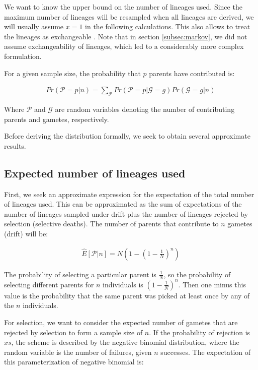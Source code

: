 \documentclass[review]{elsarticle}
\begin{document}
We want to know the upper bound on the number of lineages used. Since the maximum number of lineages
will be resampled when all lineages are derived, we will usually assume $x=1$ in the following
calculations. This also allows to treat the lineages as exchangeable \cite{Wakeley2009}. Note that
in section \ref{subsec:markov}, we did not assume exchangeability of lineages, which led to a
considerably more complex formulation.

For a given sample size, the probability that $p$ parents have contributed is:

\begin{align}
  \label{eq:conditional}
  Pr(\mathcal{P}=p|n) = \sum_{\mathcal{P}}Pr(\mathcal{P}=p|\mathcal{G}=g)Pr(\mathcal{G}=g|n)
\end{align}

Where $\mathcal{P}$ and $\mathcal{G}$ are random variables denoting the number of contributing
parents and gametes, respectively.

Before deriving the distribution formally, we seek to obtain several approximate results.

\subsection{Expected number of lineages used}
\label{subsec:exp-number}

First, we seek an approximate expression for the expectation of the total number of lineages used.
This can be approximated as the sum of expectations of the number of lineages sampled under drift
plus the number of lineages rejected by selection (selective deaths). The number of parents that
contribute to $n$ gametes (drift) will be:

\begin{align}
  \hat{E}[\mathcal{P}|n] = N(1-\left( 1 - \frac{1}{N} \right)^n)
\end{align}

The probability of selecting a particular parent is $\frac{1}{N}$, so the probability of selecting
different parents for $n$ individuals is $(1-\frac{1}{N})^n$. Then one minus this value is the
probability that the same parent was picked at least once by any of the $n$ individuals.

For selection, we want to consider the expected number of gametes that are rejected by selection
to form a sample size of $n$. If the probability of rejection is $xs$, the scheme is described by the
negative binomial distribution, where the random variable is the number of failures, given $n$
successes. The expectation of this parameterization of negative binomial is:
\end{document}
